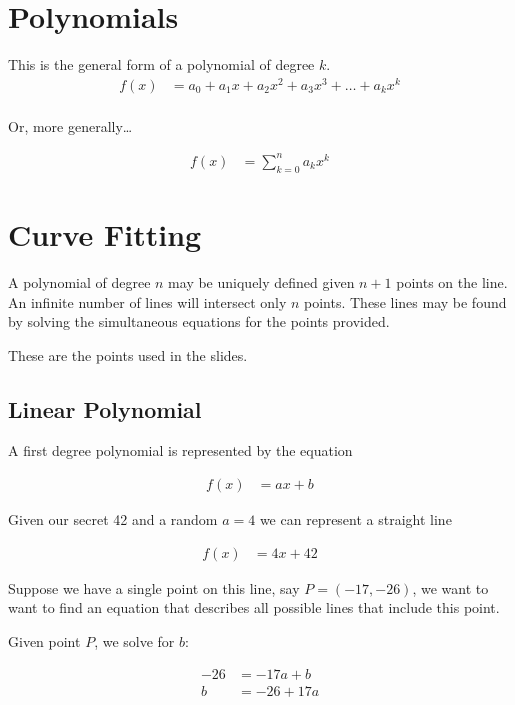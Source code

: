 \documentclass[preview,border=3mm]{article}
\begin{document}
\section{Polynomials}
\noindent
This is the general form of a polynomial of degree $k$.
\begin{align*}
    f(x) &= a_0 + a_1x + a_2x^2 + a_3x^3 + \ldots + a_kx^k\\
\end{align*}

\noindent
Or, more generally\dots

\begin{align*}
    f(x) &= \sum\limits_{k=0}^n a_kx^k
\end{align*}


\section{Curve Fitting}
\noindent
A polynomial of degree $n$ may be uniquely defined given $n+1$ points on the
line. An infinite number of lines will intersect only $n$ points. These lines
may be found by solving the simultaneous equations for the points provided.

\noindent
These are the points used in the slides.

\subsection{Linear Polynomial}

\noindent
A first degree polynomial is represented by the equation

\begin{align*}
    f(x) &= ax + b
\end{align*}

\noindent
Given our secret 42 and a random $a = 4$ we can represent a straight line

\begin{align}
    f(x) &= 4x + 42 \label{eq1}
\end{align}

\noindent
Suppose we have a single point on this line, say $P = (-17, -26)$, we want to
want to find an equation that describes all possible lines that include this
point.

\noindent
Given point $P$, we solve for $b$:


\begin{align}
    -26 &= -17a + b  \nonumber\\
    b   &= -26 + 17a \label{eq2}
\end{align}
\end{document}

